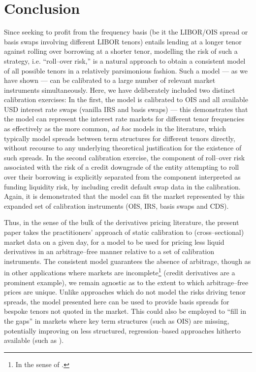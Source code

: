 \documentclass[12pt,a4paper]{article}
\theoremstyle{plain}
\numberwithin{equation}{section}
\begin{document}
\section{Conclusion}
Since seeking to profit from the frequency basis (be it the LIBOR/OIS spread or basis swaps involving different LIBOR tenors) entails lending at a longer tenor against rolling over borrowing at a shorter tenor, modelling the risk of such a strategy, i.e. ``roll--over risk,'' is a natural approach to obtain a consistent model of all possible tenors in a relatively parsimonious fashion. Such a model --- as we have shown --- can be calibrated to a large number of relevant market instruments simultaneously. Here, we have deliberately included two distinct calibration exercises: In the first, the model is calibrated to OIS and all available USD interest rate swaps (vanilla IRS and basis swaps) --- this demonstrates that the model can represent the interest rate markets for different tenor frequencies as effectively as the more common, \emph{ad hoc} models in the literature, which typically model spreads between term structures for different tenors directly, without recourse to any underlying theoretical justification for the existence of such spreads. In the second calibration exercise, the component of roll--over risk associated with the risk of a credit downgrade of the entity attempting to roll over their borrowing is explicitly separated from the component interpreted as funding liquidity risk, by including credit default swap data in the calibration. Again, it is demonstrated that the model can fit the market represented by this expanded set of calibration instruments (OIS, IRS, basis swaps and CDS).

Thus, in the sense of the bulk of the derivatives pricing literature, the present paper takes the practitioners' approach of static calibration to (cross--sectional) market data on a given day, for a model to be used for pricing less liquid derivatives in an arbitrage--free manner relative to a set of calibration instruments. The consistent model guarantees the absence of arbitrage, though as in other applications where markets are incomplete\footnote{In the sense of .} (credit derivatives are a prominent example), we remain agnostic as to the extent to which arbitrage--free prices are unique. Unlike approaches which do not model the risks driving tenor spreads, the model presented here can be used to provide basis spreads for bespoke tenors not quoted in the market. This could also be employed to ``fill in the gaps'' in markets where key term structures (such as OIS) are missing, potentially improving on less structured, regression--based approaches hitherto available (such as ).
\end{document}
